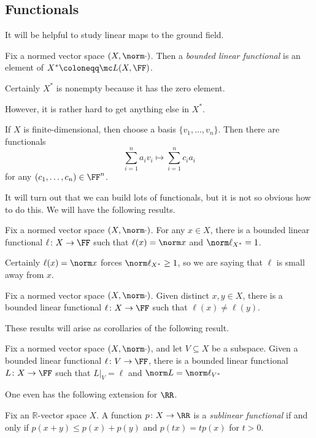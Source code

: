 \documentclass[../notes.tex]{subfiles}
\begin{document}
\subsection{Functionals}
It will be helpful to study linear maps to the ground field.
\begin{definition}[functional]
	Fix a normed vector space $(X,\norm\cdot)$. Then a \textit{bounded linear functional} is an element of $X^*\coloneqq\mc L(X,\FF)$.
\end{definition}
\begin{example}
	Certainly $X^*$ is nonempty because it has the zero element.
\end{example}
However, it is rather hard to get anything else in $X^*$.
\begin{example}
	If $X$ is finite-dimensional, then choose a basis $\{v_1,\ldots,v_n\}$. Then there are functionals
	\[\sum_{i=1}^na_iv_i\mapsto\sum_{i=1}^nc_ia_i\]
	for any $(c_1,\ldots,c_n)\in\FF^n$.
\end{example}
It will turn out that we can build lots of functionals, but it is not so obvious how to do this. We will have the following results.
\begin{corollary}
	Fix a normed vector space $(X,\norm\cdot)$. For any $x\in X$, there is a bounded linear functional $\ell\colon X\to\FF$ such that $\ell(x)=\norm x$ and $\norm\ell_{X^*}=1$.
\end{corollary}
\begin{remark}
	Certainly $\ell(x)=\norm x$ forces $\norm\ell_{X^*}\ge1$, so we are saying that $\ell$ is small away from $x$.
\end{remark}
\begin{corollary}
	Fix a normed vector space $(X,\norm\cdot)$. Given distinct $x,y\in X$, there is a bounded linear functional $\ell\colon X\to\FF$ such that $\ell(x)\ne\ell(y)$.
\end{corollary}
These results will arise as corollaries of the following result.
\begin{theorem} \label{thm:hb}
	Fix a normed vector space $(X,\norm\cdot)$, and let $V\subseteq X$ be a subspace. Given a bounded linear functional $\ell\colon V\to\FF$, there is a bounded linear functional $L\colon X\to\FF$ such that $L|_V=\ell$ and $\norm L=\norm\ell_{V^*}$
\end{theorem}
One even has the following extension for $\RR$.
\begin{definition}
	Fix an $\mathbb R$-vector space $X$. A function $p\colon X\to\RR$ is a \textit{sublinear functional} if and only if $p(x+y)\le p(x)+p(y)$ and $p(tx)=tp(x)$ for $t>0$.
\end{definition}
\end{document}
